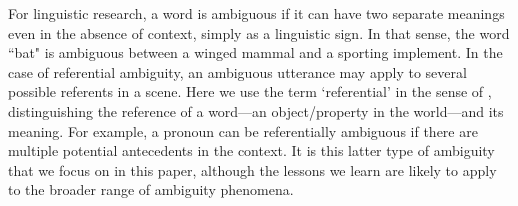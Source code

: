 \documentclass[11pt,a4paper]{article}
\newcommand{\gcs}[1]{\textcolor{blue}{[gcs: #1]}}
\begin{document}
For linguistic research, a word is ambiguous if it can have two separate meanings even in the absence of context, simply as a linguistic sign.
In that sense, the word ``bat" is ambiguous between a winged mammal and a sporting implement.
In the case of referential ambiguity, an ambiguous utterance may apply to several possible referents in a scene.
Here we use the term `referential' in the sense of , distinguishing the reference of a word---an object/property in the world---and its meaning.
For example, a pronoun can be referentially ambiguous if there are multiple potential antecedents in the context. 
It is this latter type of ambiguity that we focus on in this paper, although the lessons we learn are likely to apply to the broader range of ambiguity phenomena.


\end{document}
